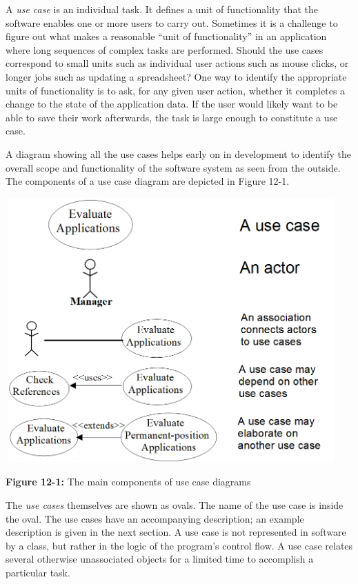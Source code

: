 A \textit{use case} is an individual task. It defines a
unit of functionality that the software enables one or more users to
carry out. Sometimes it is a challenge to figure out what makes a
reasonable ``unit of functionality'' in an
application where long sequences of complex tasks are performed. Should
the use cases correspond to small units such as individual user actions
such as mouse clicks, or longer jobs such as updating a spreadsheet?
One way to identify the appropriate units of functionality is to ask,
for any given user action, whether it completes a change to the state
of the application data. If the user would likely want to be able to
save their work afterwards, the task is large enough to constitute a
use case.

A diagram showing all the use cases helps early on in development to
identify the overall scope and functionality of the
software system as seen from the outside. The components of a use case
diagram are depicted in Figure 12-1.

\bigskip

\begin{center}
\includegraphics[width=5.0in,height=4in]{ub-img/usecase.png}

{\sffamily\bfseries Figure 12-1:}
{\sffamily The main components of use case diagrams}
\end{center}


The \textit{use cases} themselves are shown as ovals. The name of the
use case is inside the oval. The use cases have an accompanying
description; an example description is given in the next
section. A use case is not represented in software by a class, but
rather in the logic of the program's control flow. A
use case relates several otherwise unassociated objects for a limited
time to accomplish a particular task.


